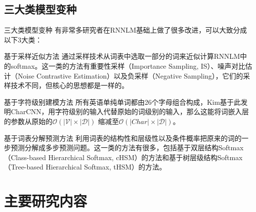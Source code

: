 \documentclass[14pt]{Bredelebeamer}
\begin{document}
\subsection{三大类模型变种}


\begin{frame}{三大类模型变种}
    有非常多研究者在RNNLM基础上做了很多改进，可以大致分成以下3大类：
    \pause
    \begin{block}{基于采样近似方法}
    通过采样技术从词表中选取一部分的词来近似计算RNNLM中的softmax。这一类的方法有重要性采样（Importance Sampling, IS）、噪声对比估计（Noise Contrastive Estimation）以及负采样（Negative Sampling），它们的采样技术不同，但核心的思想都是一样的。
    \end{block}
    \pause
    \begin{block}{基于字符级别建模方法}
    所有英语单纯单词都由26个字母组合构成，Kim基于此发明CharCNN，用字符级别的输入代替原始的词级别的输入，那么这能将词嵌入层的参数从原始的${\mathcal{O}(|\mathcal{V}| \times |\mathcal{D}|)}$ 缩减至${\mathcal{O}(|Char| \times |\mathcal{D}|)}$。
    \end{block}
    \pause
    \begin{block}{基于词表分解预测方法}
    利用词表的结构性和层级性以及条件概率把原来的词的一步预测分解成多步预测问题。这一类的方法有很多，包括基于双层结构Softmax（Class-based Hierarchical Softmax, cHSM）的方法和基于树层级结构Softmax（Tree-based Hierarchical Softmax, tHSM）的方法。
    \end{block}


\end{frame}




\section{主要研究内容}
\end{document}
